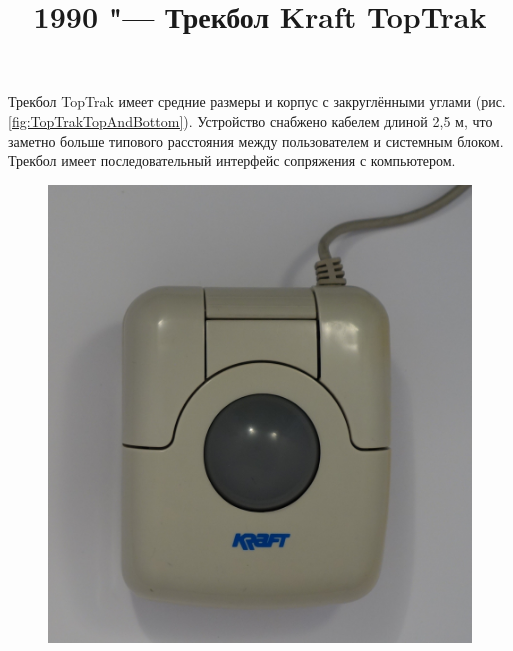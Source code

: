 \documentclass[11pt, a4paper]{article}
\begin{document}
\title{1990 "--- Трекбол Kraft TopTrak}
\date{}
\maketitle

Трекбол TopTrak имеет средние размеры и корпус с закруглёнными углами (рис. \ref{fig:TopTrakTopAndBottom}). Устройство снабжено кабелем длиной 2,5 м, что заметно больше типового расстояния между пользователем и системным блоком. Трекбол имеет последовательный интерфейс сопряжения с компьютером.

\begin{figure}[h]
    \centering
    \includegraphics[scale=0.5]{1990_kraft_toptrack/2.9.jpg}

\end{figure}
\end{document}
